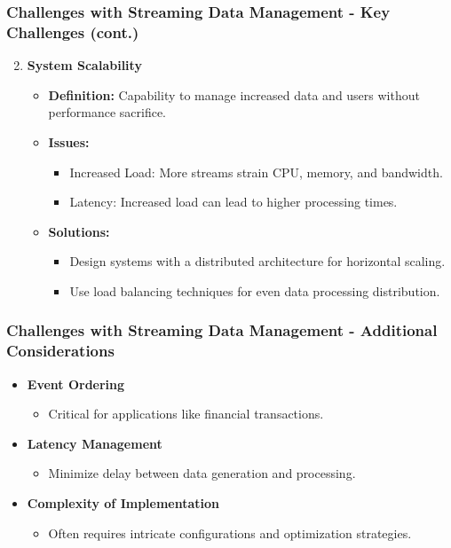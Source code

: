 \documentclass[aspectratio=169]{beamer}
\begin{document}
\begin{frame}[fragile]
    \frametitle{Challenges with Streaming Data Management - Key Challenges (cont.)}
    \begin{enumerate}
        \setcounter{enumi}{1}
        \item \textbf{System Scalability}
        \begin{itemize}
            \item \textbf{Definition:} Capability to manage increased data and users without performance sacrifice.
            \item \textbf{Issues:}
            \begin{itemize}
                \item Increased Load: More streams strain CPU, memory, and bandwidth.
                \item Latency: Increased load can lead to higher processing times.
            \end{itemize}
            \item \textbf{Solutions:}
            \begin{itemize}
                \item Design systems with a distributed architecture for horizontal scaling.
                \item Use load balancing techniques for even data processing distribution.
            \end{itemize}
        \end{itemize}
    \end{enumerate}
\end{frame}

\begin{frame}[fragile]
    \frametitle{Challenges with Streaming Data Management - Additional Considerations}
    \begin{itemize}
        \item \textbf{Event Ordering}
        \begin{itemize}
            \item Critical for applications like financial transactions.
        \end{itemize}
        \item \textbf{Latency Management}
        \begin{itemize}
            \item Minimize delay between data generation and processing.
        \end{itemize}
        \item \textbf{Complexity of Implementation}
        \begin{itemize}
            \item Often requires intricate configurations and optimization strategies.
        \end{itemize}
    \end{itemize}
\end{frame}
\end{document}
